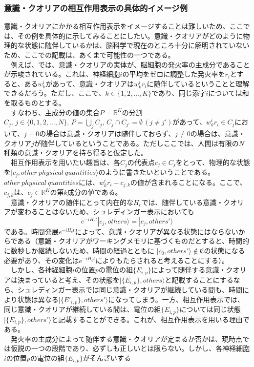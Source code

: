 \subsubsection{意識・クオリアの相互作用表示の具体的イメージ例}
意識・クオリアにかかる相互作用表示をイメージすることは難しいため、ここでは、その例を具体的に示してみることにしたい。意識・クオリアがどのように物理的な状態に随伴しているかは、脳科学で現在のところ十分に解明されていないため、ここでの記載は、あくまで可能性の一つである。\\
　例えば、\cite{Murray_2016}では、意識・クオリアの実体が、脳細胞の発火率の主成分であることが示唆されている。これは、神経細胞$i$の平均をゼロに調整した発火率を$r_i$とすると、ある$w_k^i$があって、意識・クオリアは$w_k^ir_i$に随伴しているということと理解できるだろう。ただし、ここで、$k\in\{1,2,\ldots,K\}$であり、同じ添字$i$については和を取るものとする。\\
　すなわち、主成分の値の集合$P=\mathbb{R}^K$の分割$C_j,\,j\in\{0,1,2,\ldots,N\},\, P=\bigcup_j C_j,\, C_j \cap C_{j'}=\emptyset \, (j \neq j')$があって、$w_k^ir_i \in C_j$において、$j=0$の場合は意識・クオリアは随伴しておらず、$j \neq 0$の場合は、意識・クオリア$j$が随伴しているということである。ただしここでは、人間は有限の$N$種類の意識・クオリアを持ち得ると仮定した。\\
　相互作用表示を用いたい趣旨は、各$C_j$の代表点$c_j \in C_j$をとって、物理的な状態を$|c_j,other \ physical \ quantities \rangle$のように書きたいということである。$other \ physical \  quantities$には、$w_k^ir_i - c_{j,k}$の値が含まれることになる。ここで、$c_{j,k}$は、$c_j \in \mathbb{R}^K$の第$k$成分の値である。\\
　意識・クオリアの随伴にとって内在的な$H_c$では、随伴している意識・クオリアが変わることはないため、シュレディンガー表示においても
\begin{equation}
  e^{-iH_ct}|c_j,others \rangle = |c_j,others' \rangle 
\end{equation}
である。時間発展$e^{-iH_ct}$によって、意識・クオリアが異なる状態にはならないからである（意識・クオリアがワーキングメモリに基づくものだとすると、時間的に数秒しか継続しないため、時間の経過とともに $|c_0,others' \rangle \notin \mathfrak{C}$の状態になる必要があり、その変化は$e^{-iH_ot}$によりもたらされると考えることにする）。\\
　しかし、各神経細胞$i$の位置$p$の電位の組$\{E_{i,p}\}$によって随伴する意識・クオリアは決まっていると考え、その状態を$|\{ E_{i,p}\},others \rangle$と記載することにするなら、シュレディンガー表示では同じ意識・クオリアが継続している間も、時間により状態は異なる$|\{ E'_{i,p}\},others' \rangle$になってしまう。一方、相互作用表示では、同じ意識・クオリアが継続している間は、電位の組$\{E_{i,p}\}$については同じ状態$|\{ E_{i,p}\},others' \rangle$と記載することができる。これが、相互作用表示を用いる理由である。\\
　発火率の主成分によって随伴する意識・クオリアが定まるか否かは、現時点では仮説の一つの段階であり、必ずしも正しいとは限らない。しかし、各神経細胞$i$の位置$p$の電位の組$\{E_{i,p}\}$がそんざいする